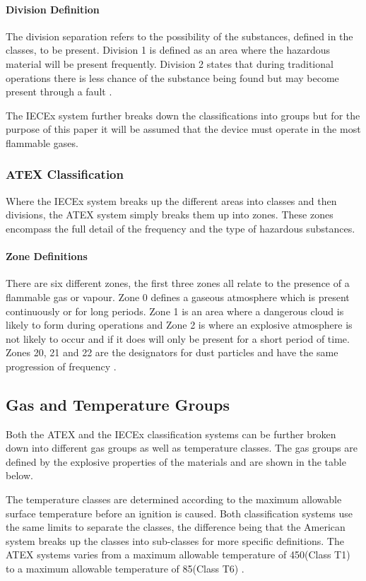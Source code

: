 \paragraph{Division Definition}
The division separation refers to the possibility of the substances, defined in the classes, to be present. Division 1 is defined as an area where the hazardous material will be present frequently. Division 2 states that during traditional operations there is less chance of the substance being found but  may become present through a fault \cite{RockwellAutomation}. 

The IECEx system further breaks down the classifications into groups but for the purpose of this paper it will be assumed that the device must operate in the most flammable gases.


\subsubsection{ATEX Classification}
Where the IECEx system breaks up the different areas into classes and then divisions, the ATEX system simply breaks them up into zones. These zones encompass the full detail of the frequency and the type of hazardous substances.

\paragraph{Zone Definitions}
There are six different zones, the first three zones all relate to the presence of a flammable gas or vapour. Zone 0 defines a gaseous atmosphere which is present continuously or for long periods. Zone 1 is an area where a dangerous cloud is likely to form during operations and Zone 2 is where an explosive atmosphere is not likely to occur and if it does will only be present for a short period of time. Zones 20, 21 and 22 are the designators for dust particles and have the same progression of frequency \cite{ATEX, SANS}.

\subsection{Gas and Temperature Groups}
Both the ATEX and the IECEx classification systems can be further broken down into different gas groups as well as temperature classes. The gas groups are defined by the explosive properties of the materials and are shown in the table below.

The temperature classes are determined according to the maximum allowable surface temperature before an ignition is caused. Both classification systems use the same limits to separate the classes, the difference being that the American system breaks up the classes into sub-classes for more specific definitions.
The ATEX systems varies from a maximum allowable temperature of 450\textdegree (Class T1) to a maximum allowable temperature of 85\textdegree (Class T6) \cite{ATEX, STAHL, SANS}.

